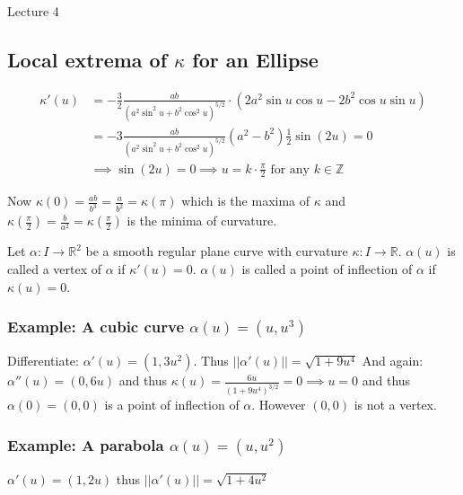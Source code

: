 \begin{center}

Lecture 4

\end{center}

\subsection{Local extrema of $\kappa$ for an Ellipse}

\begin{align*}
\kappa '(u) &= - \frac{3}{2} \frac{ab}{(a^2 \sin^2 u + b^2 \cos^2 u)^{5/2}} \cdot (2a^2 \sin u \cos u - 2b^2 \cos u \sin u) \\
&= -3 \frac{ab}{(a^2 \sin^2 u + b^2 \cos^2 u)^{5/2}} (a^2 - b^2) \frac{1}{2} \sin (2u) = 0 \\
&\implies \sin (2u) = 0 \implies u = k \cdot \frac{\pi}{2} \, \, \text{for any} \, \, k \in \mathbb{Z}
\end{align*}

Now $\kappa(0) = \frac{ab}{b^3}= \frac{a}{b^2} = \kappa(\pi)$ which is the maxima of $\kappa$ and $\kappa(\frac{\pi}{2}) = \frac{b}{a^2} = \kappa(\frac{\pi}{2})$ is the minima of curvature.

\vspace{\baselineskip}

Let $\alpha : I \rightarrow \mathbb{R}^2$ be a smooth regular plane curve with curvature $\kappa : I \rightarrow \mathbb{R}$. $\alpha(u)$ is called a vertex of $\alpha$ if $\kappa'(u) = 0$. $\alpha(u)$ is called a point of inflection of $\alpha$ if $\kappa(u) = 0$.

\subsubsection*{Example: A cubic curve $\alpha(u) = (u, u^3)$}

Differentiate: $\alpha'(u) = (1, 3u^2)$. Thus $||\alpha'(u)|| = \sqrt{1+9u^4}$ And again: $\alpha''(u) = (0, 6u)$ and thus $\kappa(u) = \frac{6u}{(1+9u^4)^{3/2}} = 0 \implies u = 0$ and thus $\alpha(0) = (0,0)$ is a point of inflection of $\alpha$. However $(0,0)$ is not a vertex.

\subsubsection*{Example: A parabola $\alpha(u) = (u, u^2)$}

$\alpha'(u) = (1, 2u)$ thus $||\alpha'(u)|| = \sqrt{1+4u^2}$

